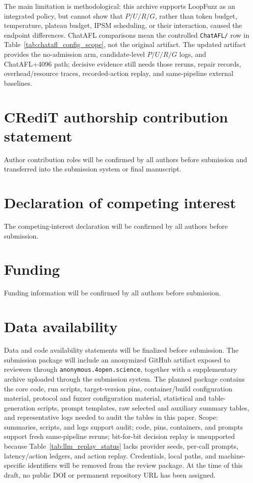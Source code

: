 \documentclass[final,5p,times,number]{elsarticle}
\begin{document}
The main limitation is methodological: this archive supports LoopFuzz as an integrated policy, but cannot show that $P/U/R/G$, rather than token budget, temperature, plateau budget, IPSM scheduling, or their interaction, caused the endpoint differences. ChatAFL comparisons mean the controlled \texttt{ChatAFL/} row in Table~\ref{tab:chatafl_config_scope}, not the original artifact. The updated artifact provides the no-admission arm, candidate-level $P/U/R/G$ logs, and ChatAFL+4096 path; decisive evidence still needs those reruns, repair records, overhead/resource traces, recorded-action replay, and same-pipeline external baselines.

\section*{CRediT authorship contribution statement}
Author contribution roles will be confirmed by all authors before submission and transferred into the submission system or final manuscript.

\section*{Declaration of competing interest}
The competing-interest declaration will be confirmed by all authors before submission.

\section*{Funding}
Funding information will be confirmed by all authors before submission.

\section*{Data availability}
Data and code availability statements will be finalized before submission. The submission package will include an anonymized GitHub artifact exposed to reviewers through \texttt{anonymous.4open.science}, together with a supplementary archive uploaded through the submission system. The planned package contains the core code, run scripts, target-version pins, container/build configuration material, protocol and fuzzer configuration material, statistical and table-generation scripts, prompt templates, raw selected and auxiliary summary tables, and representative logs needed to audit the tables in this paper. Scope: summaries, scripts, and logs support audit; code, pins, containers, and prompts support fresh same-pipeline reruns; bit-for-bit decision replay is unsupported because Table~\ref{tab:llm_replay_status} lacks provider seeds, per-call prompts, latency/action ledgers, and action replay. Credentials, local paths, and machine-specific identifiers will be removed from the review package. At the time of this draft, no public DOI or permanent repository URL has been assigned.
\end{document}

